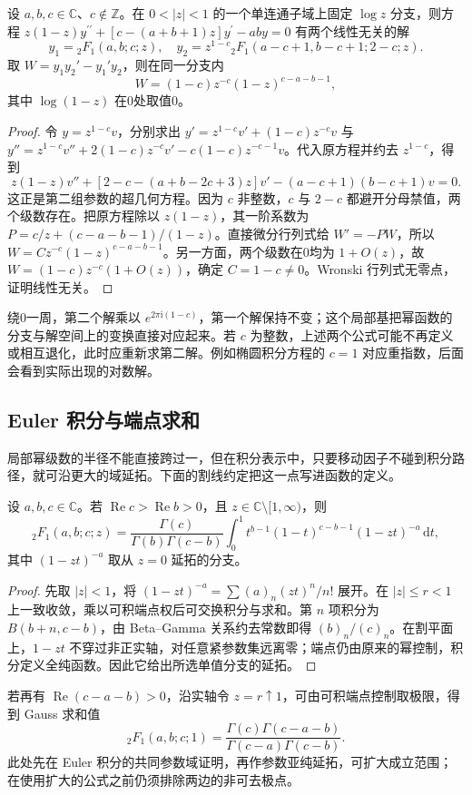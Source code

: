 \begin{proposition}[非整数指数差时的局部基]\label{b3:prop:F-local-basis}
设 \(a,b,c\in\mathbb C\)、\(c\notin\mathbb Z\)。在 \(0<|z|<1\) 的一个单连通子域上固定 \(\log z\) 分支，则方程 \(z(1-z)y^{\prime\prime}+[c-(a+b+1)z]y^{\prime}-aby=0\) 有两个线性无关的解
\[
y_1={}_2F_1(a,b;c;z),\quad
y_2=z^{1-c}{}_2F_1(a-c+1,b-c+1;2-c;z).
\]
取 \(W=y_1y_2'-y_1'y_2\)，则在同一分支内
\[
W=(1-c)z^{-c}(1-z)^{c-a-b-1},
\]
其中 \(\log(1-z)\) 在0处取值0。
\end{proposition}
\begin{proof}
令 \(y=z^{1-c}v\)，分别求出
\(y'=z^{1-c}v'+(1-c)z^{-c}v\) 与
\(y''=z^{1-c}v''+2(1-c)z^{-c}v'-c(1-c)z^{-c-1}v\)。代入原方程并约去 \(z^{1-c}\)，得到
\[
z(1-z)v''+[2-c-(a+b-2c+3)z]v'
-(a-c+1)(b-c+1)v=0.
\]
这正是第二组参数的超几何方程。因为 \(c\) 非整数，\(c\) 与 \(2-c\) 都避开分母禁值，两个级数存在。把原方程除以 \(z(1-z)\)，其一阶系数为
\(P=c/z+(c-a-b-1)/(1-z)\)。直接微分行列式给 \(W'=-PW\)，所以 \(W=Cz^{-c}(1-z)^{c-a-b-1}\)。另一方面，两个级数在0均为 \(1+O(z)\)，故 \(W=(1-c)z^{-c}(1+O(z))\)，确定 \(C=1-c\ne0\)。Wronski 行列式无零点，证明线性无关。
\end{proof}
绕0一周，第二个解乘以 \(e^{2\pi\mathrm{i}(1-c)}\)，第一个解保持不变；这个局部基把幂函数的分支与解空间上的变换直接对应起来。若 \(c\) 为整数，上述两个公式可能不再定义或相互退化，此时应重新求第二解。例如椭圆积分方程的 \(c=1\) 对应重指数，后面会看到实际出现的对数解。


\subsection{Euler 积分与端点求和}
\label{b3:subsec:F0204}

局部幂级数的半径不能直接跨过一，但在积分表示中，只要移动因子不碰到积分路径，就可沿更大的域延拓。下面的割线约定把这一点写进函数的定义。

\begin{theorem}\label{b3:thm:F-euler-integral}
设 \(a,b,c\in\mathbb C\)。若 \(\operatorname{Re}c>\operatorname{Re}b>0\)，且 \(z\in\mathbb C\setminus[1,\infty)\)，则
\[
 {}_2F_1(a,b;c;z)=\frac{\Gamma(c)}{\Gamma(b)\Gamma(c-b)}
 \int_0^1t^{b-1}(1-t)^{c-b-1}(1-zt)^{-a}\,\mathrm{d}t,
\]
其中 \((1-zt)^{-a}\) 取从 \(z=0\) 延拓的分支。
\end{theorem}
\begin{proof}
先取 \(|z|<1\)，将 \((1-zt)^{-a}=\sum(a)_n(zt)^n/n!\) 展开。在 \(|z|\le r<1\) 上一致收敛，乘以可积端点权后可交换积分与求和。第 \(n\) 项积分为 \(B(b+n,c-b)\)，由 Beta--Gamma 关系约去常数即得 \((b)_n/(c)_n\)。在割平面上，\(1-zt\) 不穿过非正实轴，对任意紧参数集远离零；端点仍由原来的幂控制，积分定义全纯函数。因此它给出所选单值分支的延拓。
\end{proof}
若再有 \(\operatorname{Re}(c-a-b)>0\)，沿实轴令 \(z=r\uparrow1\)，可由可积端点控制取极限，得到 Gauss 求和值
\[
 {}_2F_1(a,b;c;1)=\frac{\Gamma(c)\Gamma(c-a-b)}{\Gamma(c-a)\Gamma(c-b)}.
\]
此处先在 Euler 积分的共同参数域证明，再作参数亚纯延拓，可扩大成立范围；在使用扩大的公式之前仍须排除两边的非可去极点。

